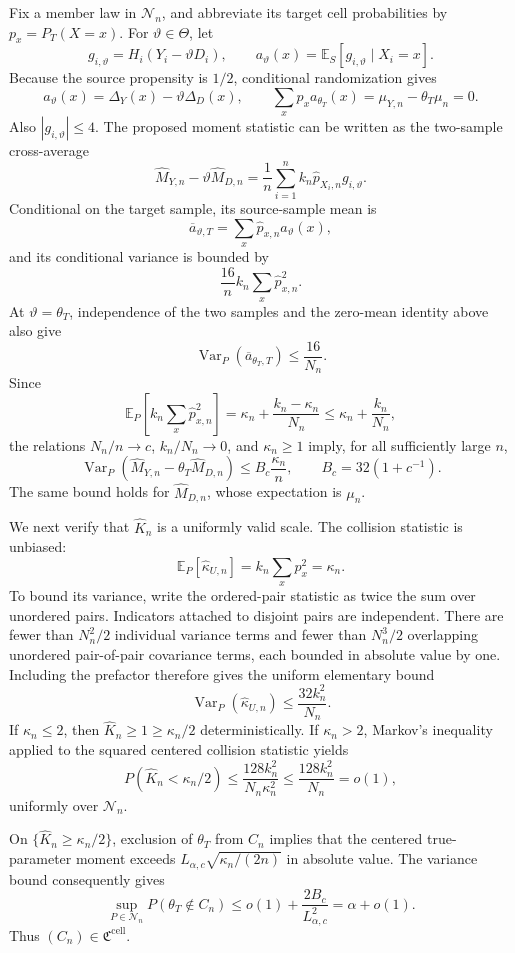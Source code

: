 Fix a member law in \(\mathcal N_n\), and abbreviate its target cell probabilities by \(p_x=P_T(X=x)\).  For \(\vartheta\in\Theta\), let
\[
 g_{i,\vartheta}=H_i(Y_i-\vartheta D_i),\qquad
 a_\vartheta(x)=\mathbb E_S[g_{i,\vartheta}\mid X_i=x].
\]
Because the source propensity is \(1/2\), conditional randomization gives
\[
 a_\vartheta(x)=\Delta_Y(x)-\vartheta\Delta_D(x),\qquad
 \sum_xp_xa_{\theta_T}(x)=\mu_{Y,n}-\theta_T\mu_n=0.
\]
Also \(|g_{i,\vartheta}|\le4\).  The proposed moment statistic can be written as the two-sample cross-average
\[
 \widehat M_{Y,n}-\vartheta\widehat M_{D,n}
 =\frac1n\sum_{i=1}^nk_n\widehat p_{X_i,n}g_{i,\vartheta}.
\]
Conditional on the target sample, its source-sample mean is
\[
 \overline a_{\vartheta,T}=\sum_x\widehat p_{x,n}a_\vartheta(x),
\]
and its conditional variance is bounded by
\[
 \frac{16}{n}k_n\sum_x\widehat p_{x,n}^2.
\]
At \(\vartheta=\theta_T\), independence of the two samples and the zero-mean identity above also give
\[
 \operatorname{Var}_P(\overline a_{\theta_T,T})\le\frac{16}{N_n}.
\]
Since
\[
 \mathbb E_P\left[k_n\sum_x\widehat p_{x,n}^2\right]
 =\kappa_n+\frac{k_n-\kappa_n}{N_n}
 \le\kappa_n+\frac{k_n}{N_n},
\]
the relations \(N_n/n\to c\), \(k_n/N_n\to0\), and \(\kappa_n\ge1\) imply, for all sufficiently large \(n\),
\[
 \operatorname{Var}_P(\widehat M_{Y,n}-\theta_T\widehat M_{D,n})
 \le B_c\frac{\kappa_n}{n},\qquad B_c=32(1+c^{-1}).
\]
The same bound holds for \(\widehat M_{D,n}\), whose expectation is \(\mu_n\).

We next verify that \(\widehat K_n\) is a uniformly valid scale.  The collision statistic is unbiased:
\[
 \mathbb E_P[\widehat\kappa_{U,n}]
 =k_n\sum_xp_x^2=\kappa_n.
\]
To bound its variance, write the ordered-pair statistic as twice the sum over unordered pairs.  Indicators attached to disjoint pairs are independent.  There are fewer than \(N_n^2/2\) individual variance terms and fewer than \(N_n^3/2\) overlapping unordered pair-of-pair covariance terms, each bounded in absolute value by one.  Including the prefactor therefore gives the uniform elementary bound
\[
 \operatorname{Var}_P(\widehat\kappa_{U,n})
 \le\frac{32k_n^2}{N_n}.
\]
If \(\kappa_n\le2\), then \(\widehat K_n\ge1\ge\kappa_n/2\) deterministically.  If \(\kappa_n>2\), Markov's inequality applied to the squared centered collision statistic yields
\[
 P(\widehat K_n<\kappa_n/2)
 \le\frac{128k_n^2}{N_n\kappa_n^2}
 \le\frac{128k_n^2}{N_n}=o(1),
\]
uniformly over \(\mathcal N_n\).

On \(\{\widehat K_n\ge\kappa_n/2\}\), exclusion of \(\theta_T\) from \(C_n\) implies that the centered true-parameter moment exceeds \(L_{\alpha,c}\sqrt{\kappa_n/(2n)}\) in absolute value.  The variance bound consequently gives
\[
 \sup_{P\in\mathcal N_n}P(\theta_T\notin C_n)
 \le o(1)+\frac{2B_c}{L_{\alpha,c}^2}
 =\alpha+o(1).
\]
Thus \((C_n)\in\mathfrak C^{\mathrm{cell}}\).

